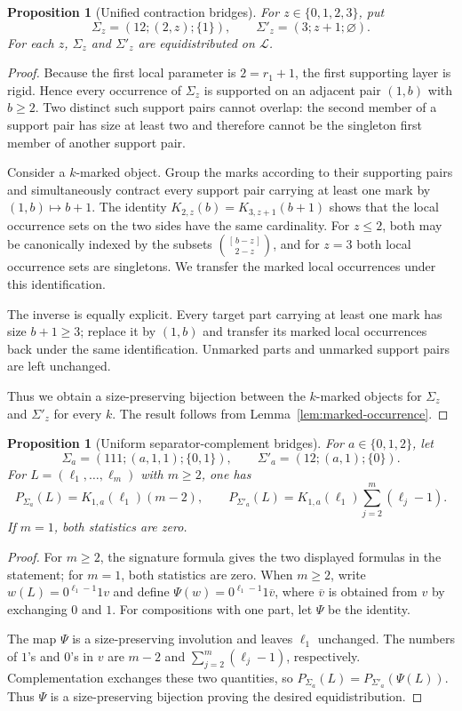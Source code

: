 \documentclass[12pt]{article}
\newtheorem{prop}[thm]{Proposition}
\newcommand{\cL}{\mathcal L}
\begin{document}
\begin{prop}[Unified contraction bridges]\label{prop:unified-contraction}
For $z\in\{0,1,2,3\}$, put
\[
\Sigma_z=(12;(2,z);\{1\}),
\qquad
\Sigma'_z=(3;z+1;\varnothing).
\]
For each $z$, $\Sigma_z$ and $\Sigma'_z$ are equidistributed on $\cL$.
\end{prop}

\begin{proof}
Because the first local parameter is $2=r_1+1$, the first supporting layer
is rigid.  Hence every occurrence of $\Sigma_z$ is supported on an adjacent
pair $(1,b)$ with $b\ge2$.  Two distinct such support pairs cannot overlap:
the second member of a support pair has size at least two and therefore
cannot be the singleton first member of another support pair.

Consider a $k$-marked object.  Group the marks according to their supporting
pairs and simultaneously contract every support pair carrying at least one
mark by $(1,b)\mapsto b+1$.  The identity
$K_{2,z}(b)=K_{3,z+1}(b+1)$ shows that the local occurrence sets on the two
sides have the same cardinality.  For $z\le2$, both may be canonically indexed
by the subsets $\binom{[\,b-z\,]}{2-z}$, and for $z=3$ both local occurrence
sets are singletons.  We transfer the marked local occurrences under this
identification.

The inverse is equally explicit.  Every target part carrying at least one
mark has size $b+1\ge3$; replace it by $(1,b)$ and transfer its marked local
occurrences back under the same identification.  Unmarked parts and unmarked
support pairs are left unchanged.

Thus we obtain a size-preserving bijection between the $k$-marked objects
for $\Sigma_z$ and $\Sigma'_z$ for every $k$.  The result follows from
Lemma~\ref{lem:marked-occurrence}.
\end{proof}

\begin{prop}[Uniform separator-complement bridges]\label{prop:unified-complement}
For $a\in\{0,1,2\}$, let
\[
\Sigma_a=(111;(a,1,1);\{0,1\}),
\qquad
\Sigma'_a=(12;(a,1);\{0\}).
\]
For $L=(\ell_1,\ldots,\ell_m)$ with $m\ge2$, one has
\[
P_{\Sigma_a}(L)=K_{1,a}(\ell_1)(m-2),
\qquad
P_{\Sigma'_a}(L)=K_{1,a}(\ell_1)\sum_{j=2}^m(\ell_j-1).
\]
If $m=1$, both statistics are zero.
\end{prop}

\begin{proof}
For $m\ge2$, the signature formula gives the two displayed formulas in the
statement; for $m=1$, both statistics are zero.  When $m\ge2$, write
$w(L)=0^{\ell_1-1}1v$ and define
$\Psi(w)=0^{\ell_1-1}1\overline v$, where $\overline v$ is obtained from $v$
by exchanging $0$ and $1$.  For compositions with one part, let $\Psi$ be the
identity.

The map $\Psi$ is a size-preserving involution and leaves $\ell_1$ unchanged.
The numbers of $1$'s and $0$'s in $v$ are $m-2$ and
$\sum_{j=2}^m(\ell_j-1)$, respectively.  Complementation exchanges these two
quantities, so
$P_{\Sigma_a}(L)=P_{\Sigma'_a}(\Psi(L))$.  Thus $\Psi$ is a size-preserving
bijection proving the desired equidistribution.
\end{proof}
\end{document}
